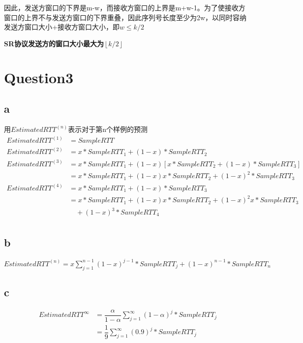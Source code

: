 \documentclass[UTF8]{article}
\begin{document}
因此，发送方窗口的下界是m-w，而接收方窗口的上界是m+w-1。为了使接收方窗口的上界不与发送方窗口的下界重叠，因此序列号长度至少为2w，以同时容纳发送方窗口大小+接收方窗口大小，即$w\leq k/2 $

\textmd{\textbf{SR协议发送方的窗口大小最大为$\left\lfloor k/2 \right\rfloor$}}

\section*{Question3}
\subsection*{a}
用$EstimatedRTT^{(n)}$表示对于第n个样例的预测
\begin{align*}
    EstimatedRTT^{(1)} & =  SampleRTT                                                           \\
    EstimatedRTT^{(2)} & = x * SampleRTT_{1}+(1-x) * SampleRTT_{2}                              \\
    EstimatedRTT^{(3)} & =   x * SampleRTT_{1}+(1-x)[x * SampleRTT_{2} +(1-x) * SampleRTT_{3}]  \\
                       & =
    x * SampleRTT_{1}+(1-x)x * SampleRTT_{2} +(1-x)^{2} * SampleRTT_{3}                         \\
    EstimatedRTT^{(4)} & =  x * SampleRTT_{1}+(1-x) * SampleRTT_{3}                             \\
                       & =  x * SampleRTT_{1}+(1-x)x * SampleRTT_{2}+(1-x)^{2}x * SampleRTT_{3} \\ & \quad+(1-x)^{3} * SampleRTT_{4} \\
\end{align*}
\vspace*{-1.5cm}
\subsection*{b}
$EstimatedRTT^{(n)} = x\sum\limits_{j=1}^{n-1}(1-x)^{j-1}*SampleRTT_{j}+(1-x)^{n-1}*SampleRTT_{n}$
\subsection*{c}
\vspace*{-1cm}
\begin{align*}
    EstimatedRTT^{\infty} & = \dfrac{\alpha}{1-\alpha}\sum\limits_{j= 1}^{\infty}(1-\alpha)^{j}*SampleRTT_{j} \\
                          & = \dfrac{1}{9}\sum\limits_{j=1}^{\infty}(0.9)^{j}*SampleRTT_{j}
\end{align*}
\end{document}
